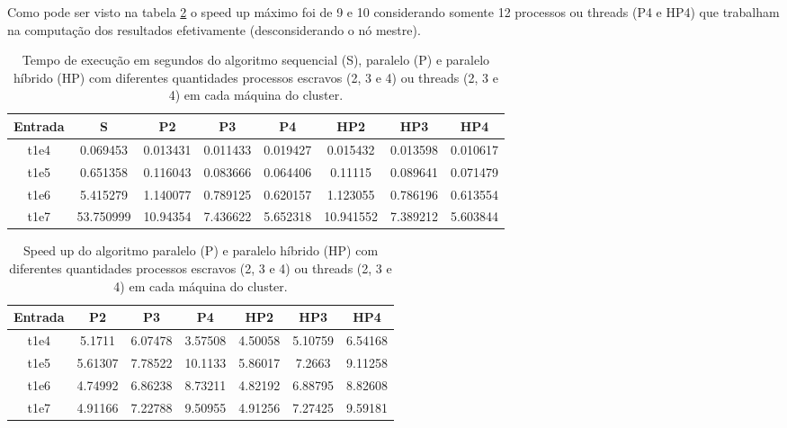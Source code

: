 \documentclass[12pt]{article}
\begin{document}
Como pode ser visto na tabela \ref{tab:results_speedup} o speed up máximo foi de 9 e 10 considerando somente 12 processos ou threads (P4 e HP4) que trabalham na computação dos resultados efetivamente (desconsiderando o nó mestre).


\begin{table}[H]
	\footnotesize
\begin{adjustbox}{center}
	\begin{tabular}{|c|c|ccc|ccc|}
		\hline
		Entrada & S         & P2       & P3       & P4       & HP2       & HP3      & HP4      \\
		\hline
		t1e4    & 0.069453  & 0.013431 & 0.011433 & 0.019427 & 0.015432  & 0.013598 & 0.010617 \\
		t1e5    & 0.651358  & 0.116043 & 0.083666 & 0.064406 & 0.11115   & 0.089641 & 0.071479 \\
		t1e6    & 5.415279  & 1.140077 & 0.789125 & 0.620157 & 1.123055  & 0.786196 & 0.613554 \\
		t1e7    & 53.750999 & 10.94354 & 7.436622 & 5.652318 & 10.941552 & 7.389212 & 5.603844 \\
		\hline
	\end{tabular}
      \end{adjustbox}
	\caption{Tempo de execução em segundos do algoritmo sequencial (S), paralelo (P) e paralelo híbrido (HP) com diferentes quantidades processos escravos (2, 3 e 4) ou threads (2, 3 e 4) em cada máquina do cluster.}
	\label{tab:results}
\end{table}

\begin{table}[H]
	\footnotesize
\begin{adjustbox}{center}
	\begin{tabular}{|c|ccc|ccc|}
		\hline
		Entrada & P2       & P3       & P4       & HP2       & HP3      & HP4      \\
		\hline
		t1e4    & 5.1711  & 6.07478 &  3.57508 & 4.50058 & 5.10759 & 6.54168 \\
		t1e5    & 5.61307 & 7.78522 & 10.1133  & 5.86017 & 7.2663  & 9.11258 \\
		t1e6    & 4.74992 & 6.86238 &  8.73211 & 4.82192 & 6.88795 & 8.82608 \\
		t1e7    & 4.91166 & 7.22788 &  9.50955 & 4.91256 & 7.27425 & 9.59181 \\
		\hline
	\end{tabular}
      \end{adjustbox}
	\caption{Speed up do algoritmo paralelo (P) e paralelo híbrido (HP) com diferentes quantidades processos escravos (2, 3 e 4) ou threads (2, 3 e 4) em cada máquina do cluster.}
	\label{tab:results_speedup}
\end{table}
\end{document}
